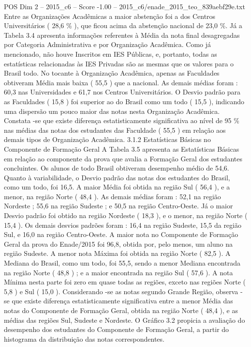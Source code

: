 \begin{textsample}{POS Dim 2 – 2015\_c6 – Score -1.00 – 2015\_c6/enade\_2015\_teo\_839aebf29e.txt}
Entre as Organizações Acadêmicas a maior abstenção foi a dos Centros Universitários ( 28,6 \% ), que ficou acima da abstenção nacional de 23,0 \%.
Já a Tabela 3.4 apresenta informações referentes à Média da nota final desagregadas por Categoria Administrativa e por Organização Acadêmica.
Como já mencionado, não houve Inscritos em IES Públicas, e, portanto, todas as estatísticas relacionadas às IES Privadas são as mesmas que os valores para o Brasil todo.
No tocante à Organização Acadêmica, apenas as Faculdades obtiveram Média mais baixa ( 55,5 ) que a nacional.
As demais médias foram : 60,3 nas Universidades e 61,7 nos Centros Universitários.
O Desvio padrão para as Faculdades ( 15,8 ) foi superior ao do Brasil como um todo ( 15,5 ), indicando uma dispersão um pouco maior das notas nesta Organização Acadêmica.
Constata -se que existe diferença estatisticamente significativa ao nível de 95 \% nas médias das notas dos estudantes das Faculdade ( 55,5 ) em relação aos demais tipos de Organização Acadêmica. 3.1.2 Estatísticas Básicas no Componente de Formação Geral A Tabela 3.5 apresenta as Estatísticas Básicas em relação ao componente da prova que avalia a Formação Geral dos estudantes concluintes.
Os alunos de todo Brasil obtiveram desempenho médio de 54,6.
Quanto à variabilidade, o Desvio padrão das notas dos estudantes do Brasil, como um todo, foi 16,5.
A maior Média foi obtida na região Sul ( 56,4 ), e a menor, na região Norte ( 48,4 ).
As demais médias foram : 52,1 na região Nordeste ; 55,6 na região Sudeste ; e 50,5 na região Centro-Oeste.
Já o maior Desvio padrão foi obtido na região Nordeste ( 18,3 ), e o menor, na região Norte ( 15,4 ).
Os demais desvios padrões foram : 16,4 na região Sudeste, 15,5 da região Sul, e 16,0 na região Centro-Oeste.
A maior nota no Componente de Formação Geral da prova do Enade/2015 foi 96,8, obtida por, pelo menos, um aluno na região Sudeste.
A menor nota Máxima foi obtida na região Norte ( 82,5 ).
A Mediana do Brasil, como um todo, foi 55,5, sendo a menor Mediana encontrada na região Norte ( 48,8 ) ; e a maior encontrada na região Sul ( 57,6 ).
A nota Mínima nesta parte foi zero em quase todas as regiões, exceto nas regiões Norte ( 5,8 ) e Sul ( 15,0 ).
Considerando -se as notas segundo Grande Região, observa -se que existe diferença estatisticamente significativa entre a menor Média das notas do Componente de Formação Geral, obtida na região Norte ( 48,4 ), e as médias das regiões Sul, Sudeste e Nordeste.
O Gráfico 3.2 propicia a avaliação do desempenho dos estudantes do Componente de Formação Geral, a partir do histograma da distribuição das notas correspondentes.

\end{textsample}
